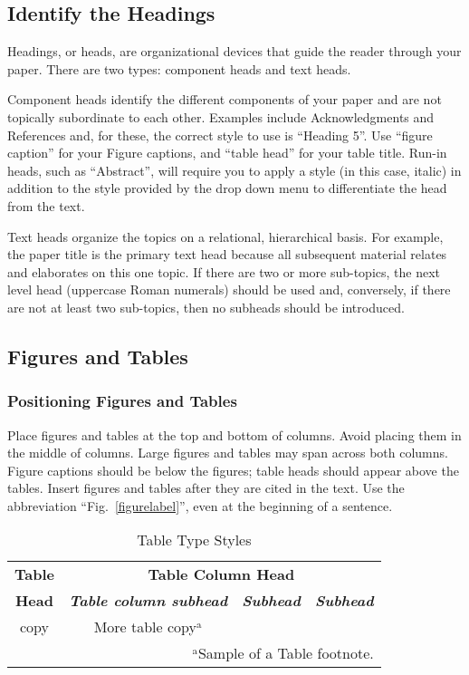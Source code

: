 \documentclass[conference, letter]{IEEEtran}
\begin{document}
\subsection{Identify the Headings}

Headings, or heads, are organizational devices that guide the reader through your paper. There are two types: component heads and text heads.

Component heads identify the different components of your paper and are not topically subordinate to each other. Examples include Acknowledgments and References and, for these, the correct style to use is ``Heading 5''. Use ``figure caption'' for your Figure captions, and ``table head'' for your table title. Run-in heads, such as ``Abstract'', will require you to apply a style (in this case, italic) in addition to the style provided by the drop 
down menu to differentiate the head from the text.

Text heads organize the topics on a relational, hierarchical basis. For example, the paper title is the primary text head because all subsequent material relates and elaborates on this one topic. If there are two or more sub-topics, the next level head (uppercase Roman numerals) should be used and, conversely, if there are not at least two sub-topics, then no subheads should be introduced.

\subsection{Figures and Tables}

\subsubsection{Positioning Figures and Tables} Place figures and tables at the top and bottom of columns. Avoid placing them in the middle of columns. Large figures and tables may span across both columns. Figure captions should be below the figures; table heads should appear above the tables. Insert figures and tables after they are cited in the text. Use the abbreviation ``Fig.~\ref{figurelabel}'', even at the beginning of a sentence.

\begin{table}[htbp]
\caption{Table Type Styles}
\begin{center}
\begin{tabular}{|c|c|c|c|}
\hline
\textbf{Table}&\multicolumn{3}{|c|}{\textbf{Table Column Head}} \\
\cline{2-4} 
\textbf{Head} & \textbf{\textit{Table column subhead}}& \textbf{\textit{Subhead}}& \textbf{\textit{Subhead}} \\
\hline
copy& More table copy$^{\mathrm{a}}$& &  \\
\hline
\multicolumn{4}{r}{$^{\mathrm{a}}$Sample of a Table footnote.}
\end{tabular}
\label{tab1}
\end{center}
\end{table}
\end{document}
